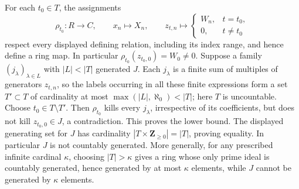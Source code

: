 \begin{remark}
\medskip\noindent
For each $t_0\in T$, the assignments
$$
\rho_{t_0}:R\longrightarrow C,\qquad
x_n\longmapsto X_n,\qquad
z_{t,n}\longmapsto
\begin{cases}W_n,&t=t_0,\\0,&t\ne t_0\end{cases}
$$
respect every displayed defining relation, including its index range,
and hence define a ring map. In particular
$\rho_{t_0}(z_{t_0,0})=W_0\ne0$.
Suppose a family $(j_\lambda)_{\lambda\in L}$ with $|L|<|T|$
generated $J$. Each $j_\lambda$ is a finite sum of multiples
of generators $z_{t,n}$, so the labels occurring in all these
finite expressions form a set $T'\subset T$ of cardinality at most
$\max(|L|,\aleph_0)<|T|$; here $T$ is uncountable.
Choose $t_0\in T\setminus T'$. Then $\rho_{t_0}$ kills every
$j_\lambda$, irrespective of its coefficients, but does not kill
$z_{t_0,0}\in J$, a contradiction.
This proves the lower bound. The displayed generating set for $J$
has cardinality $|T\times\mathbf Z_{\geq0}|=|T|$, proving equality.
In particular $J$ is not countably generated.
More generally, for any prescribed infinite cardinal $\kappa$, choosing
$|T|>\kappa$ gives a ring whose only prime ideal is countably
generated, hence generated by at most $\kappa$ elements, while $J$
cannot be generated by $\kappa$ elements.
\end{remark}